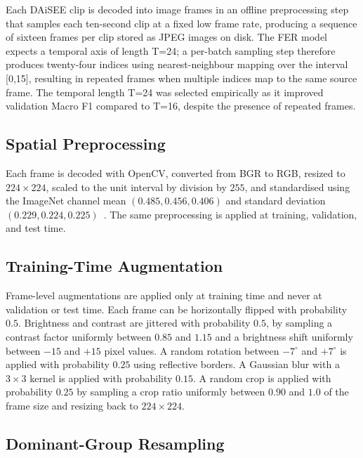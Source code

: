 Each \ac{DAiSEE} clip is decoded into image frames in an offline preprocessing step that samples each ten-second clip at a fixed low frame rate, producing a sequence of sixteen frames per clip stored as JPEG images on disk. The \ac{FER} model expects a temporal axis of length T=24; a per-batch sampling step therefore produces twenty-four indices using nearest-neighbour mapping over the interval [0,15], resulting in repeated frames when multiple indices map to the same source frame. The temporal length T=24 was selected empirically as it improved validation Macro F1 compared to T=16, despite the presence of repeated frames.

\subsection{Spatial Preprocessing}\label{sec:method_preprocessing}

Each frame is decoded with OpenCV, converted from BGR to RGB, resized to $224 \times 224$, scaled to the unit interval by division by $255$, and standardised using the ImageNet channel mean $(0.485, 0.456, 0.406)$ and standard deviation $(0.229, 0.224, 0.225)$~\cite{he_resnet_2016}. The same preprocessing is applied at training, validation, and test time.

\subsection{Training-Time Augmentation}\label{sec:method_augmentation}

Frame-level augmentations are applied only at training time and never at validation or test time. Each frame can be horizontally flipped with probability $0.5$. Brightness and contrast are jittered with probability $0.5$, by sampling a contrast factor uniformly between $0.85$ and $1.15$ and a brightness shift uniformly between $-15$ and $+15$ pixel values. A random rotation between $-7^{\circ}$ and $+7^{\circ}$ is applied with probability $0.25$ using reflective borders. A Gaussian blur with a $3 \times 3$ kernel is applied with probability $0.15$. A random crop is applied with probability $0.25$ by sampling a crop ratio uniformly between $0.90$ and $1.0$ of the frame size and resizing back to $224 \times 224$.

\subsection{Dominant-Group Resampling}\label{sec:method_oversampling}

